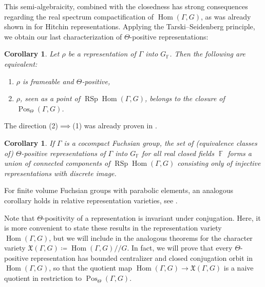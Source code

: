\documentclass{amsart}
\theoremstyle{plain}
\newtheorem{CoroIntro}[ThmIntro]{Corollary}
\theoremstyle{definition}
\DeclareMathOperator{\Hom}{Hom}
\DeclareMathOperator{\RSp}{RSp}
\DeclareMathOperator{\Pos}{Pos}
\DeclareMathOperator{\Fb}{{\mathbb{F}}}
\newcommand{\1}{\mathbf{1}}
\begin{document}
This semi-algebraicity, combined with the closedness  has strong consequences regarding the real spectrum compactification of $\Hom(\Gamma, G)$, as was already shown in \cite{Flamm} for Hitchin representations.
Applying the Tarski--Seidenberg principle, we obtain our last characterization of $\Theta$-positive representations:

\begin{CoroIntro} \label{coro:Positive = limit of positive}
    Let $\rho$ be a representation of $\Gamma$ into $G_{\Fb}$. Then the following are equivalent:
    \begin{enumerate}
        \item $\rho$ is frameable and $\Theta$-positive,
        \item $\rho$, seen as a point of $\RSp\Hom(\Gamma,G)$, belongs to the closure of $\Pos_\Theta(\Gamma, G)$.
    \end{enumerate}
\end{CoroIntro}

The direction (2)$\implies$(1) was already proven in \cite[Theorem 1.11, Theorem 6.20]{BurgerIozziParreauPozzetti_RSCCharacterVarieties2}.

\begin{CoroIntro} \label{coro: positive form connected components}
    If $\Gamma$ is a cocompact Fuchsian group, the set of (equivalence classes of) $\Theta$-positive representations of $\Gamma$ into $G_{\Fb}$ for all real closed fields $\Fb$ forms a union of connected components of $\RSp\Hom(\Gamma, G)$ consisting only of injective representations with discrete image.
\end{CoroIntro}
For finite volume Fuchsian groups with parabolic elements, an analogous corollary holds in relative representation varieties, see .

Note that $\Theta$-positivity of a representation is invariant under conjugation. Here, it is more convenient to state these results in the representation variety $\Hom(\Gamma,G)$, but we will include in  the analogous theorems for the character variety $\mathfrak X(\Gamma,G) \coloneqq \Hom(\Gamma,G)/\!\!/G$. In fact, we will prove that every $\Theta$-positive representation has bounded centralizer and closed conjugation orbit in $\Hom(\Gamma,G)$, so that the quotient map $\Hom(\Gamma,G) \to \mathfrak X(\Gamma,G)$ is a naive quotient in restriction to $\Pos_\Theta(\Gamma,G)$.
\end{document}

